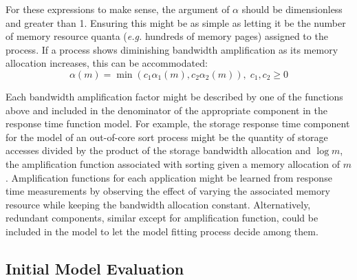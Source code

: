 For these expressions to make sense, the argument of $\alpha$ should be dimensionless and greater than 1.
Ensuring this might be as simple as letting it be the number of memory resource quanta
(\emph{e.g.} hundreds of memory pages) assigned to the process.
If a process shows diminishing bandwidth amplification as its memory allocation increases, this can be accommodated:
\begin{displaymath}
\alpha(m) = \min(c_1\alpha_1(m),c_2\alpha_2(m)),\;c_1,c_2 \geq 0
\end{displaymath}

Each bandwidth amplification factor might be described by one of the functions above
and included in the denominator of the appropriate component in the response time function model.
For example, the storage response time component for the model of an out-of-core sort process might be
the quantity of storage accesses divided by the product of the storage bandwidth allocation and $\log m$,
the amplification function associated with sorting given a memory allocation of $m$.
Amplification functions for each application might be learned from response time measurements
by observing the effect of varying the associated memory resource while keeping the bandwidth allocation constant.
Alternatively, redundant components, similar except for amplification function, could be included in the model
to let the model fitting process decide among them.

\subsection*{Initial Model Evaluation}



